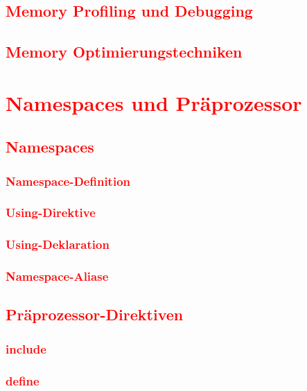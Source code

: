 \section{\textcolor{red}{Memory Profiling und Debugging}}\label{sec:memory-profiling}
\section{\textcolor{red}{Memory Optimierungstechniken}}\label{sec:memory-optimization}

\chapter{\textcolor{red}{Namespaces und Präprozessor}}\label{chap:namespaces-preprocessor}
\section{\textcolor{red}{Namespaces}}\label{sec:namespaces}
\subsection{\textcolor{red}{Namespace-Definition}}\label{sec:namespace-definition}
\subsection{\textcolor{red}{Using-Direktive}}\label{sec:using-directive}
\subsection{\textcolor{red}{Using-Deklaration}}\label{sec:using-declaration}
\subsection{\textcolor{red}{Namespace-Aliase}}\label{sec:namespace-aliases}
\section{\textcolor{red}{Präprozessor-Direktiven}}\label{sec:preprocessor}
\subsection{\textcolor{red}{include}}\label{sec:include}
\subsection{\textcolor{red}{define}}\label{sec:define}
